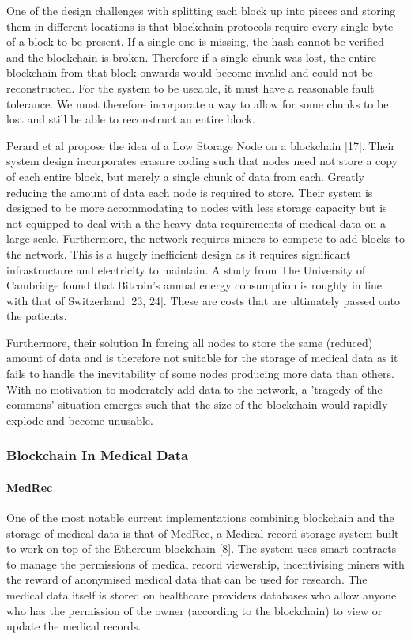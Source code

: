 \documentclass[]{article}
\let\oldparagraph\paragraph
\renewcommand{\paragraph}[1]{\oldparagraph{#1}\mbox{}}
\begin{document}
One of the design challenges with splitting each block up into pieces
and storing them in different locations is that blockchain protocols
require every single byte of a block to be present. If a single one is
missing, the hash cannot be verified and the blockchain is broken.
Therefore if a single chunk was lost, the entire blockchain from that
block onwards would become invalid and could not be reconstructed. For
the system to be useable, it must have a reasonable fault tolerance. We
must therefore incorporate a way to allow for some chunks to be lost and
still be able to reconstruct an entire block.

Perard et al propose the idea of a Low Storage Node on a blockchain
{[}17{]}. Their system design incorporates erasure coding such that
nodes need not store a copy of each entire block, but merely a single
chunk of data from each. Greatly reducing the amount of data each node
is required to store. Their system is designed to be more accommodating
to nodes with less storage capacity but is not equipped to deal with a
the heavy data requirements of medical data on a large scale.
Furthermore, the network requires miners to compete to add blocks to the
network. This is a hugely inefficient design as it requires significant
infrastructure and electricity to maintain. A study from The University
of Cambridge found that Bitcoin's annual energy consumption is roughly
in line with that of Switzerland {[}23, 24{]}. These are costs that are
ultimately passed onto the patients.

Furthermore, their solution In forcing all nodes to store the same
(reduced) amount of data and is therefore not suitable for the storage
of medical data as it fails to handle the inevitability of some nodes
producing more data than others. With no motivation to moderately add
data to the network, a 'tragedy of the commons' situation emerges such
that the size of the blockchain would rapidly explode and become
unusable.

\hypertarget{header-n25}{%
\subsubsection{Blockchain In Medical Data}\label{header-n25}}

\hypertarget{header-n26}{%
\paragraph{MedRec}\label{header-n26}}

One of the most notable current implementations combining blockchain and
the storage of medical data is that of MedRec, a Medical record storage
system built to work on top of the Ethereum blockchain {[}8{]}. The
system uses smart contracts to manage the permissions of medical record
viewership, incentivising miners with the reward of anonymised medical
data that can be used for research. The medical data itself is stored on
healthcare providers databases who allow anyone who has the permission
of the owner (according to the blockchain) to view or update the medical
records.
\end{document}
